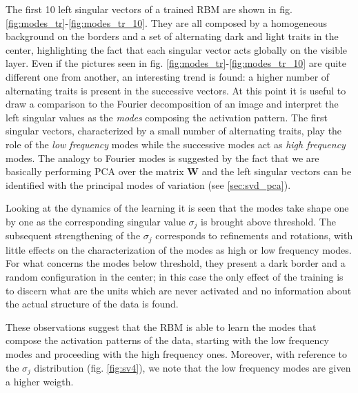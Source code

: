 \documentclass[notitlepage]{revtex4-1}
\begin{document}
The first 10 left singular vectors of a trained RBM are shown in fig. \ref{fig:modes_tr}-\ref{fig:modes_tr_10}. They are all composed by a homogeneous background on the borders and a set of alternating dark and light traits in the center, highlighting the fact that each singular vector acts globally on the visible layer. Even if the pictures seen in fig. \ref{fig:modes_tr}-\ref{fig:modes_tr_10} are quite different one from another, an interesting trend is found: a higher number of alternating traits is present in the successive vectors. At this point it is useful to draw a comparison to the Fourier decomposition of an image and interpret the left singular values as the \textit{modes} composing the activation pattern. The first singular vectors, characterized by a small number of alternating traits, play the role of the \textit{low frequency} modes while the successive modes act as \textit{high frequency} modes. The analogy to Fourier modes is suggested by the fact that we are basically performing PCA over the matrix \textbf{W} and the left singular vectors can be identified with the principal modes of variation (see \ref{sec:svd_pca}).

Looking at the dynamics of the learning it is seen that the modes take shape one by one as the corresponding singular value \(\sigma_j\) is brought above threshold. The subsequent strengthening of the \(\sigma_j\) corresponds to refinements and rotations, with little effects on the characterization of the modes as high or low frequency modes. For what concerns the modes below threshold, they present a dark border and a random configuration in the center; in this case the only effect of the training is to discern what are the units which are never activated and no information about the actual structure of the data is found.

These observations suggest that the RBM is able to learn the modes that compose the activation patterns of the data, starting with the low frequency modes and proceeding with the high frequency ones. Moreover, with reference to the \(\sigma_j\) distribution (fig. \ref{fig:sv4}), we note that the low frequency modes are given a higher weigth.
\end{document}
